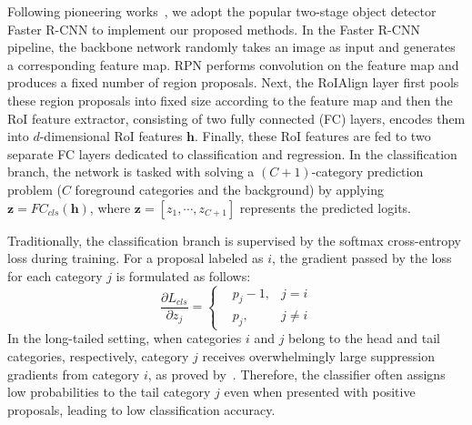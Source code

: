 \documentclass[lettersize,journal]{IEEEtran}
\begin{document}
Following pioneering works~\cite{li2020overcoming, wang2021adaptive}, we adopt the popular two-stage object detector Faster R-CNN to implement our proposed methods.
In the Faster R-CNN pipeline, the backbone network randomly takes an image as input and generates a corresponding feature map.
RPN performs convolution on the feature map and produces a fixed number of region proposals.
Next, the RoIAlign layer first pools these region proposals into fixed size according to the feature map and then the RoI feature extractor, consisting of two fully connected (FC) layers, encodes them into $d$-dimensional RoI features $\bm{h}$.
Finally, these RoI features are fed to two separate FC layers dedicated to classification and regression.
In the classification branch, the network is tasked with solving a $(C+1)$-category prediction problem ($C$ foreground categories and the background) by applying $\bm{z}=FC_{cls}(\bm{h})$, where $\bm{z}=[z_1,\cdots, z_{C+1}]$ represents the predicted logits.

Traditionally, the classification branch is supervised by the softmax cross-entropy loss during training.
For a proposal labeled as $i$, the gradient passed by the loss for each category $j$ is formulated as follows:
\begin{equation}
    \frac{\partial L_{cls}}{\partial z_j}=\left\{
        \begin{aligned}
            & p_j - 1, & j=i\\
            & p_j, & j\neq i
        \end{aligned}
    \right.
\end{equation}
In the long-tailed setting, when categories $i$ and $j$ belong to the head and tail categories, respectively, category $j$ receives overwhelmingly large suppression gradients from category $i$, as proved by~\cite{tan2020equalization,wang2021seesaw}.
Therefore, the classifier often assigns low probabilities to the tail category $j$ even when presented with positive proposals, leading to low classification accuracy.
\end{document}
